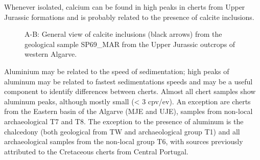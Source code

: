 \documentclass[
  a4paper,
  DIV=11,
  numbers=noendperiod]{scrreprt}
\begin{document}
Whenever isolated, calcium can be found in high peaks in cherts from
Upper Jurassic formations and is probably related to the presence of
calcite inclusions.

\begin{figure}


\caption{\label{fig-calcite}A-B: General view of calcite inclusions
(black arrows) from the geological sample SP69\_MAR from the Upper
Jurassic outcrops of western Algarve.}

\end{figure}%

Aluminium may be related to the speed of sedimentation; high peaks of
aluminum may be related to fastest sedimentations speeds and may be a
useful component to identify differences between cherts. Almost all
chert samples show aluminum peaks, although mostly small (\textless{} 3
cpv/ev). An exception are cherts from the Eastern basin of the Algarve
(MJE and UJE), samples from non-local archaeological T7 and T8. The
exception to the presence of aluminum is the chalcedony (both geological
from TW and archaeological group T1) and all archaeological samples from
the non-local group T6, with sources previously attributed to the
Cretaceous cherts from Central Portugal.
\end{document}

